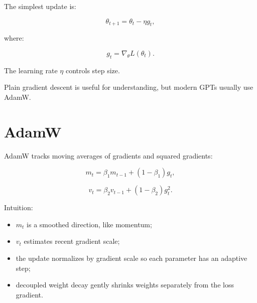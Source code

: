 The simplest update is:

\[
\theta_{t+1}=\theta_t-\eta g_t,
\]

where:

\[
g_t=\nabla_\theta L(\theta_t).
\]

The learning rate \(\eta\) controls step size.

\begin{center}
\end{center}

Plain gradient descent is useful for understanding, but modern GPTs usually use AdamW.

\section{AdamW}

AdamW tracks moving averages of gradients and squared gradients:

\[
m_t=\beta_1m_{t-1}+(1-\beta_1)g_t,
\]

\[
v_t=\beta_2v_{t-1}+(1-\beta_2)g_t^2.
\]

Intuition:

\begin{itemize}
  \item \(m_t\) is a smoothed direction, like momentum;
  \item \(v_t\) estimates recent gradient scale;
  \item the update normalizes by gradient scale so each parameter has an adaptive step;
  \item decoupled weight decay gently shrinks weights separately from the loss gradient.
\end{itemize}


